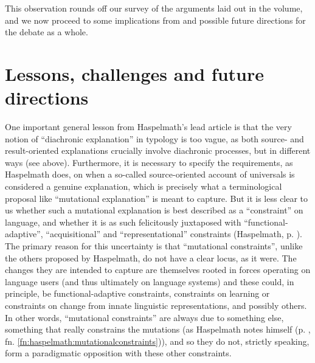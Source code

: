 \documentclass[output=paper]{langsci/langscibook}
\begin{document}
This observation rounds off our survey of the arguments laid out in the volume, and we now proceed to some implications from and possible future directions for the debate as a whole.

\section{Lessons, challenges and future directions}\label{sec:epilogue:2}

One important general lesson from Haspelmath’s lead article is that the very notion of “diachronic explanation” in typology is too vague, as both source- and result-oriented explanations crucially involve diachronic processes, but in different ways (see  above). Furthermore, it is necessary to specify the requirements, as Haspelmath does, on when a so-called source-oriented account of universals is considered a genuine explanation, which is precisely what a terminological proposal like “mutational explanation” is meant to capture. But it is less clear to us whether such a mutational explanation is best described as a “constraint” on language, and whether it is as such felicitously juxtaposed with “functional-adaptive”, “acquisitional” and “representational” constraints (Haspelmath, p. \pageref{p:haspelmath:representationalconstraints}). The primary reason for this uncertainty is that “mutational constraints”, unlike the others proposed by Haspelmath, do not have a clear locus, as it were. The changes they are intended to capture are themselves rooted in forces operating on language users (and thus ultimately on language systems) and these could, in principle, be functional-adaptive constraints, constraints on learning or constraints on change from innate linguistic representations, and possibly others. In other words, “mutational constraints” are always due to something else, something that really constrains the mutations (as Haspelmath notes himself (p. \pageref{fn:haspelmath:mutationalconstraints}, fn. \ref{fn:haspelmath:mutationalconstraints})), and so they do not, strictly speaking, form a paradigmatic opposition with these other constraints.
\end{document}
